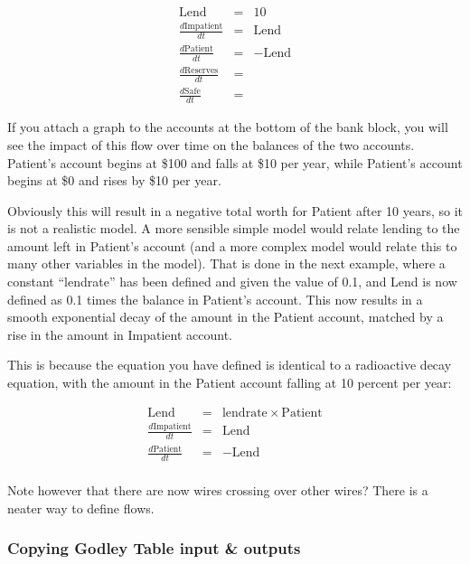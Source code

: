 \begin{eqnarray*}
\mathrm{Lend}&=&10\\
\frac{d\mathrm{Impatient}}{dt}&=&\mathrm{Lend}\\
\frac{d\mathrm{Patient}}{dt}&=&-\mathrm{Lend}\\
\frac{d\mathrm{Reserves}}{dt}&=&\\
\frac{d\mathrm{Safe}}{dt}&=&
\end{eqnarray*}



If you attach a graph to the accounts at the bottom of the bank block,
you will see the impact of this flow over time on the balances of the
two accounts. Patient's account begins at \$100 and falls at \$10 per
year, while Patient's account begins at \$0 and rises by \$10 per
year.



Obviously this will result in a negative total worth for Patient after
10 years, so it is not a realistic model. A more sensible simple model
would relate lending to the amount left in Patient's account (and a
more complex model would relate this to many other variables in the
model). That is done in the next example, where a constant ``lendrate''
has been defined and given the value of 0.1, and Lend is now defined
as 0.1 times the balance in Patient's account. This now results in a
smooth exponential decay of the amount in the Patient account, matched
by a rise in the amount in Impatient account.



This is because the equation you have defined is identical to a
radioactive decay equation, with the amount in the Patient account
falling at 10 percent per year:

\begin{eqnarray*}
\mathrm{Lend}&=&\mathrm{lendrate}\times\mathrm{Patient}\\
\frac{d\mathrm{Impatient}}{dt}&=&\mathrm{Lend}\\
\frac{d\mathrm{Patient}}{dt}&=&-\mathrm{Lend}\\
\end{eqnarray*}

Note however that there are now wires crossing over other wires? There
is a neater way to define flows. 

\subsubsection{Copying Godley Table input \& outputs}

